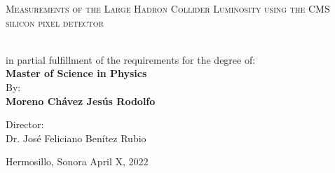 %
%
%
%
%
%
%
%
%
%
%

%
%
%
%
%
%
%
%
%
%
%
%
%
%
%
\begin{minipage}[l][0.78\textheight][t]{0.1\textwidth}
    \begin{center}
    \hskip0pt
    \vrule width2.5pt height17cm    %
        \hskip1mm
        \vrule width1pt height17cm  %
        \end{center}
\end{minipage}
\begin{minipage}[c][0.78\textheight][t]{0.8\textwidth}
      \begin{center}
      \vspace{2cm}
        {\Large \scshape {Measurements of the Large Hadron Collider Luminosity using the CMS silicon pixel detector}}

        \vspace{3cm}

          \\[20pt]
         in partial fulfillment of the
requirements for the degree of:\\[5pt]
        {\Large \textbf{{Master of Science in Physics}}}\\[40pt]
        By:\\[12pt]
        \textbf{  {\large Moreno Chávez Jesús Rodolfo}}

        \vspace{2cm}

        { \large Director}:\\Dr. José Feliciano Benítez Rubio

        \vspace{2.5cm}

        { Hermosillo, Sonora} \hskip2.5cm {April X, 2022}
      \end{center}
\end{minipage}
